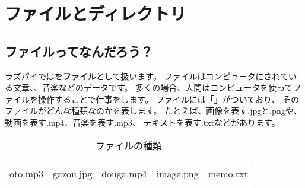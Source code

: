 \newpage
\section{ファイルとディレクトリ}
\subsection{ファイルってなんだろう？}
ラズパイではを{\bf ファイル}として扱います。
ファイルはコンピュータにされている文章、、音楽などのデータです。
多くの場合、人間はコンピュータを使ってファイルを操作することで仕事をします。
ファイルには「」がついており、
そのファイルがどんな種類なのかを表します。
たとえば、画像を表す.jpgと.pngや、動画を表す.mp4、音楽を表す.mp3、
テキストを表す.txtなどがあります。

\begin{table}[H]
  \begin{center}
    \caption[tab:files]{ファイルの種類}
    \begin{tabular}{|c|c|c|c|c|} \hline
    \begin{minipage}{0.12\hsize}
      \begin{center}
        
      \end{center}  
    \end{minipage} & 
    \begin{minipage}{0.12\hsize}
      \begin{center}
        
      \end{center}
    \end{minipage} &
    \begin{minipage}{0.12\hsize}
      \begin{center}
        
      \end{center} 
    \end{minipage} &
    \begin{minipage}{0.12\hsize}
      \begin{center}
        
      \end{center} 
    \end{minipage} &
    \begin{minipage}{0.12\hsize}
      \begin{center}
        
      \end{center} 
    \end{minipage} \\ \hline
    oto.mp3 & gazou.jpg & douga.mp4 & image.png & memo.txt \\ \hline
  \end{tabular}
 \end{center}
\end{table}

